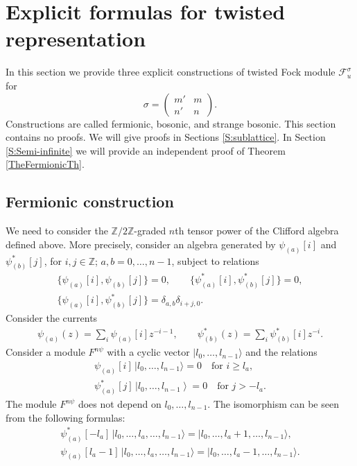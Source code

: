 \documentclass[11pt]{article}
\numberwithin{equation}{section}
\theoremstyle{definition}
\newcommand{\psia}{\psi_{({a})}}
\newcommand{\psiaa}{\psi^*_{( \! a \! )}}
\newcommand{\psib}{\psi^*_{( b )}}
\newcommand{\psibb}{\psi_{( b )}}
\begin{document}
\setcounter{section}{3}
\setcounter{subsection}{3}
\setcounter{subsubsection}{0}
\setcounter{Theorem}{17}
\setcounter{equation}{16}
\section{Explicit formulas for twisted representation} \label{Section with answers}
In this section we provide three explicit constructions of twisted Fock module $\mathcal{F}^\sigma_u$ for
\begin{equation} \label{sigma}
\sigma = \begin{pmatrix}m' & m \\
n' & n
\end{pmatrix}.
\end{equation}
Constructions are called fermionic, bosonic, and strange bosonic. This section contains no proofs. We will give proofs in Sections \ref{S:sublattice}. In Section \ref{S:Semi-infinite} we will provide an independent proof of Theorem \ref{TheFermionicTh}.

\subsection{Fermionic construction} \label{section: The Fermionic Th}

We need to consider the $\mathbb{Z}/2 \mathbb{Z}$-graded $n$th tensor power of the Clifford algebra defined above. More precisely, consider an algebra generated by $\psia [i]$ and $\psib [j]$, for $i,j \in \mathbb{Z}$; $a,b=0, \dots , n-1$, subject to relations
\begin{gather} \label{eq:nClifford1}
\big\{ \psia[i], \psibb[j] \big\} =0, \qquad \big\{ \psiaa [i], \psib[j] \big\} =0, \\ \big\{ \psia [i] , \psib [j] \big\} = \delta_{a,b} \delta_{i+j, 0}. \label{eq:nClifford2}
\end{gather}
Consider the currents
\begin{gather*}
\psia (z) = \sum_{i} \psia [i] z^{-i-1}, \qquad \psib(z) = \sum_i \psib[i] z^{-i}. \label{eq:nFermions}
\end{gather*}
Consider a module $F^{n\psi}$ with a cyclic vector $|l_0, \dots, l_{n-1} \rangle$ and the relations
\begin{gather*}
\psia [i] \, |l_0, \dots, l_{n-1} \rangle = 0 \quad \text{for } i \geqslant l_a, \\ \psiaa [j] \, \left|l_0, \dots, l_{n-1} \right\rangle = 0 \quad \text{for } j > -l_a.
\end{gather*}
The module $F^{n\psi}$ does not depend on $l_0, \dots, l_{n-1}$. The isomorphism can be seen from the following formulas:
\begin{gather*}
\psiaa [ -l_a ] \, |l_0, \dots, l_a, \dots, l_{n-1} \rangle = | l_0, \dots, l_a+1, \dots , l_{n-1} \rangle, \\
\psia [ l_a-1 ] \, |l_0, \dots, l_a, \dots , l_{n-1} \rangle = |l_0, \dots, l_a-1, \dots , l_{n-1} \rangle.
\end{gather*}
\end{document}
